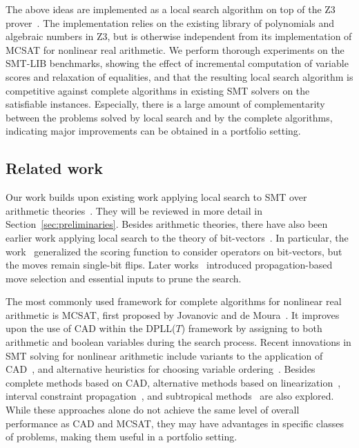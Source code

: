 \documentclass[runningheads]{llncs}
\begin{document}
The above ideas are implemented as a local search algorithm on top of the Z3 prover~\cite{MouraB08}. %
The implementation relies on the existing library of polynomials and algebraic numbers in Z3, but is otherwise independent from its implementation of MCSAT for nonlinear real arithmetic. We perform thorough experiments on the SMT-LIB benchmarks, showing the effect of incremental computation of variable scores and relaxation of equalities, and that the resulting local search algorithm is competitive against complete algorithms in existing SMT solvers on the satisfiable instances. Especially, there is a large amount of complementarity between the problems solved by local search and by the complete algorithms, indicating major improvements can be obtained in a portfolio setting.

\vspace{-2mm}
\subsection{Related work}

Our work builds upon existing work applying local search to SMT over arithmetic theories~\cite{CaiLZ22,abs-2303-06676,LiXZ23}. They will be reviewed in more detail in Section~\ref{sec:preliminaries}. Besides arithmetic theories, there have also been earlier work applying local search to the theory of bit-vectors~\cite{GriggioPST11,FrohlichBWH15,NiemetzPB16}. In particular, the work~\cite{FrohlichBWH15} generalized the scoring function to consider operators on bit-vectors, but the moves remain single-bit flips. Later works~\cite{Niemetz2015ImprovingLS,NiemetzPB16} introduced propagation-based move selection and essential inputs to prune the search.

The most commonly used framework for complete algorithms for nonlinear real arithmetic is MCSAT, first proposed by Jovanovic and de Moura~\cite{JovanovicM12,MouraJ13}. It improves upon the use of CAD within the DPLL($T$) framework by assigning to both arithmetic and boolean variables during the search process. Recent innovations in SMT solving for nonlinear arithmetic include variants to the application of CAD~\cite{AbrahamDEK21}, and alternative heuristics for choosing variable ordering~\cite{LiXZZ23}. Besides complete methods based on CAD, alternative methods based on linearization~\cite{CimattiGIRS18}, interval constraint propagation~\cite{KhanhO12,TungKO17}, and subtropical methods~\cite{FontaineOSV17,NalbachA23} are also explored. While these approaches alone do not achieve the same level of overall performance as CAD and MCSAT, they may have advantages in specific classes of problems, making them useful in a portfolio setting.
\end{document}

